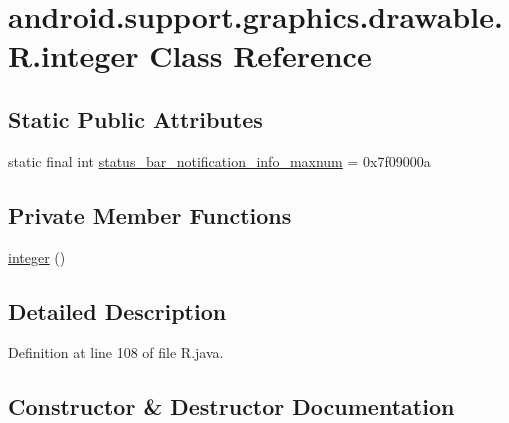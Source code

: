 \hypertarget{classandroid_1_1support_1_1graphics_1_1drawable_1_1_r_1_1integer}{}\section{android.\+support.\+graphics.\+drawable.\+R.\+integer Class Reference}
\label{classandroid_1_1support_1_1graphics_1_1drawable_1_1_r_1_1integer}
\subsection*{Static Public Attributes}
\begin{DoxyCompactItemize}
\item 
static final int \mbox{\hyperlink{classandroid_1_1support_1_1graphics_1_1drawable_1_1_r_1_1integer_a3940dbc80d681bc0c63c0e82e05868c6}{status\+\_\+bar\+\_\+notification\+\_\+info\+\_\+maxnum}} = 0x7f09000a
\end{DoxyCompactItemize}
\subsection*{Private Member Functions}
\begin{DoxyCompactItemize}
\item 
\mbox{\hyperlink{classandroid_1_1support_1_1graphics_1_1drawable_1_1_r_1_1integer_a0fb67ef1ca271f1889e7798ca73d37d4}{integer}} ()
\end{DoxyCompactItemize}


\subsection{Detailed Description}


Definition at line 108 of file R.\+java.



\subsection{Constructor \& Destructor Documentation}
\mbox{\label{classandroid_1_1support_1_1graphics_1_1drawable_1_1_r_1_1integer_a0fb67ef1ca271f1889e7798ca73d37d4}} 
